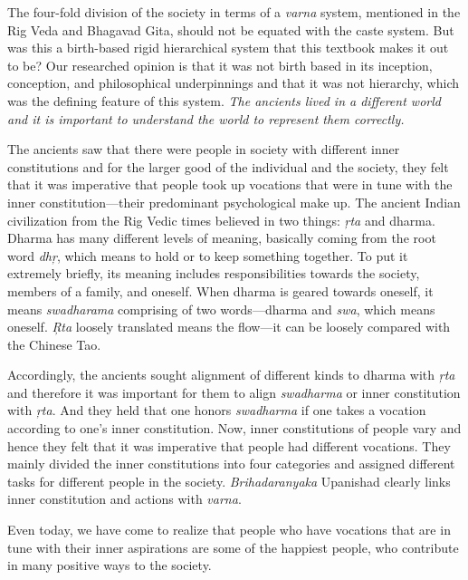 The four-fold division of the society in terms of a \textit{varna} system, mentioned in the Rig Veda and Bhagavad Gita, should not be equated with the caste system. But was this a birth-based rigid hierarchical system that this textbook makes it out to be? Our researched opinion is that it was not birth based in its inception, conception, and philosophical underpinnings and that it was not hierarchy, which was the defining feature of this system. \textit{The ancients lived in a different world and it is important to understand the world to represent them correctly.} 
\vskip 3.2pt

The ancients saw that there were people in society with different inner constitutions and for the larger good of the individual and the society, they felt that it was imperative that people took up vocations that were in tune with the inner constitution—their predominant psychological make up. The ancient Indian civilization from the Rig Vedic times believed in two things: \textit{ŗta} and dharma. Dharma has many different levels of meaning, basically coming from the root word \textit{dhŗ},  which means to hold or to keep something together. To put it extremely briefly, its meaning includes responsibilities towards the society, members of a family, and oneself. When dharma is geared towards oneself, it means \textit{swadharama} comprising of two words—dharma and \textit{swa},  which means oneself. \textit{Ŗta} loosely translated means the flow—it can be loosely compared with the Chinese Tao. 
\vskip 3.2pt

Accordingly, the ancients sought alignment of different kinds to dharma with \textit{ŗta} and therefore it was important for them to align \textit{swadharma} or inner constitution with \textit{ŗta}. And they held that one honors \textit{swadharma} if one takes a vocation according to one’s inner constitution. Now, inner constitutions of people vary and hence they felt that it was imperative that people had different vocations. They mainly divided the inner constitutions into four categories and assigned different tasks for different people in the society. \textit{Brihadaranyaka} Upanishad clearly links inner constitution and actions with \textit{varna}. 

Even today, we have come to realize that people who have vocations that are in tune with their inner aspirations are some of the happiest people, who contribute in many positive ways to the society. 

